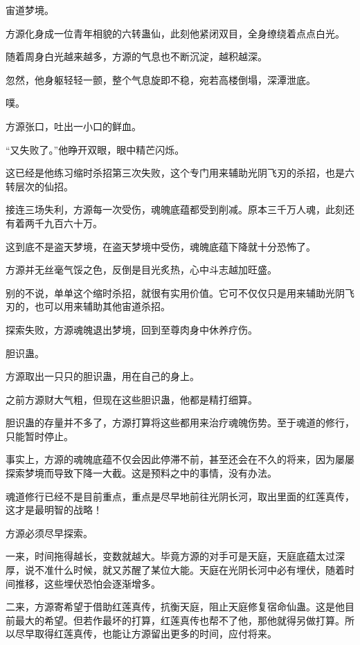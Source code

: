 
\begin{this_body}



宙道梦境。

方源化身成一位青年相貌的六转蛊仙，此刻他紧闭双目，全身缭绕着点点白光。

随着周身白光越来越多，方源的气息也不断沉淀，越积越深。

忽然，他身躯轻轻一颤，整个气息旋即不稳，宛若高楼倒塌，深潭泄底。

噗。

方源张口，吐出一小口的鲜血。

“又失败了。”他睁开双眼，眼中精芒闪烁。

这已经是他练习缩时杀招第三次失败，这个专门用来辅助光阴飞刃的杀招，也是六转层次的仙招。

接连三场失利，方源每一次受伤，魂魄底蕴都受到削减。原本三千万人魂，此刻还有着两千九百六十万。

这到底不是盗天梦境，在盗天梦境中受伤，魂魄底蕴下降就十分恐怖了。

方源并无丝毫气馁之色，反倒是目光炙热，心中斗志越加旺盛。

别的不说，单单这个缩时杀招，就很有实用价值。它可不仅仅只是用来辅助光阴飞刃的，也可以用来辅助其他宙道杀招。

探索失败，方源魂魄退出梦境，回到至尊肉身中休养疗伤。

胆识蛊。

方源取出一只只的胆识蛊，用在自己的身上。

之前方源财大气粗，但现在这些胆识蛊，他都是精打细算。

胆识蛊的存量并不多了，方源打算将这些都用来治疗魂魄伤势。至于魂道的修行，只能暂时停止。

事实上，方源的魂魄底蕴不仅会因此停滞不前，甚至还会在不久的将来，因为屡屡探索梦境而导致下降一大截。这是预料之中的事情，没有办法。

魂道修行已经不是目前重点，重点是尽早地前往光阴长河，取出里面的红莲真传，这才是最明智的战略！

方源必须尽早探索。

一来，时间拖得越长，变数就越大。毕竟方源的对手可是天庭，天庭底蕴太过深厚，说不准什么时候，就又苏醒了某位大能。天庭在光阴长河中必有埋伏，随着时间推移，这些埋伏恐怕会逐渐增多。

二来，方源寄希望于借助红莲真传，抗衡天庭，阻止天庭修复宿命仙蛊。这是他目前最大的希望。但若作最坏的打算，红莲真传也帮不了他，那他就得另做打算。所以尽早取得红莲真传，也能让方源留出更多的时间，应付将来。


\end{this_body}
